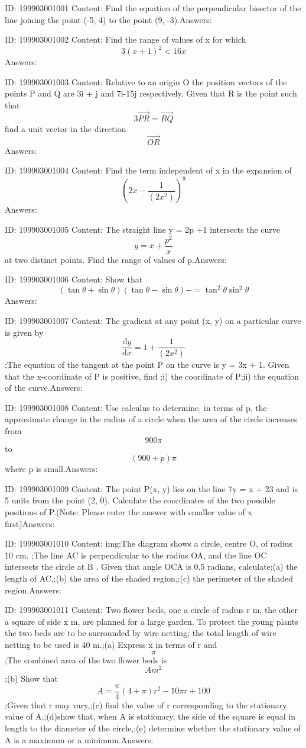 \documentclass{article}
\begin{document}
ID: 199903001001
Content:
Find the equation of the perpendicular bisector of the line joining the point (-5, 4) to the point (9, -3).Answers:

ID: 199903001002
Content:
Find the range of values of x for which \[3(x+1)^2<16x\]Answers:

ID: 199903001003
Content:
Relative to an origin O the position vectors of the points P and Q are 3i + j and 7i-15j respectively. Given that R is the point such that \[3\vec{PR}=\vec{RQ}\] find a unit vector in the direction \[\vec{OR}\]Answers:

ID: 199903001004
Content:
Find the term independent of x in the expansion of \[(2x-\frac{1}{(2x^2)})^9\]Answers:

ID: 199903001005
Content:
The straight line y = 2p +1 intersects the curve \[y=x+\frac{p^{2}}{x}\] at two distinct points. Find the range of values of p.Answers:

ID: 199903001006
Content:
Show that \[(\tan\theta+\sin\theta)(\tan\theta-\sin\theta)-=\tan^2\theta\sin^2\theta\] Answers:

ID: 199903001007
Content:
The gradient at any point (x, y) on a particular curve is given by \[\frac{\mathrm{d} y}{\mathrm{d} x}=1+\frac{1}{(2x^2)}\];The equation of the tangent at the point P on the curve is y = 3x + 1. Given that the x-coordinate of P is positive, find ;i) the coordinate of P;ii) the equation of the curve.Answers:

ID: 199903001008
Content:
Use calculus to determine, in terms of p, the approximate change in the radius of a circle when the area of the circle increases from \[900\pi\] to\[ (900 + p)\pi\] where p is small.Answers:

ID: 199903001009
Content:
The point P(x, y) lies on the line 7y = x + 23 and is 5 units from the point (2, 0). Calculate the coordinates of the two possible positions of P.(Note: Please enter the answer with smaller value of x first)Answers:

ID: 199903001010
Content:
img;The diagram shows a circle, centre O, of radius 10 cm. ;The line AC is perpendicular to the radius OA, and the line OC intersects the circle at B . Given that angle OCA is 0.5 radians, calculate;(a)	the length of AC,;(b)	the area of the shaded region,;(c)	the perimeter of the shaded region.Answers:

ID: 199903001011
Content:
Two flower beds, one a circle of radius r m, the other a square of side x m, are planned for a large garden. To protect the young plants the two beds are to be surrounded by wire netting; the total length of wire netting to be used is 40 m.;(a)	Express x in terms of r and \[\pi\];The combined area of the two flower beds is \[Am^2\];(b)	Show that \[A=\frac{\pi}{4}(4+\pi)r^2-10\pi r+100\];Given that r may vary,;(c) find the value of r corresponding to the stationary value of A,;(d)show that, when A is stationary, the side of the square is equal in length to the diameter of the circle,;(e)	determine whether the stationary value of A is a maximum or a minimum.Answers:
\end{document}
